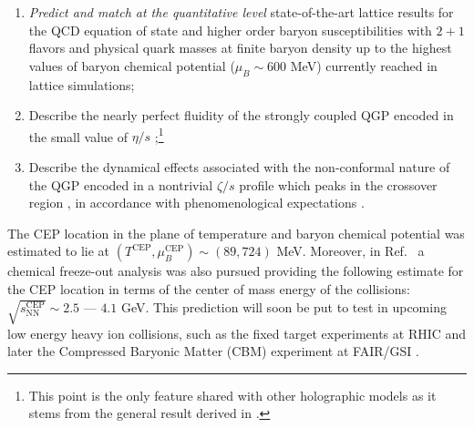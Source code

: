 \documentclass[aps,prd,showkeys,superscriptaddress,singlecolumn,nofootinbib,floatfix]{revtex4-1}
\begin{document}
\begin{enumerate}

\item {\it Predict and match at the quantitative level} state-of-the-art lattice results \cite{Bazavov:2017dus,Bellwied:2015lba} for the QCD equation of state and higher order baryon susceptibilities with $2+1$ flavors and physical quark masses at finite baryon density up to the highest values of baryon chemical potential ($\mu_B \sim 600$ MeV) currently reached in lattice simulations;

\item Describe the nearly perfect fluidity of the strongly coupled QGP encoded in the small value of $\eta/s$ \cite{Ryu:2015vwa,Bernhard:2016tnd};\footnote{This point is the only feature shared with other holographic models as it stems from the general result derived in \cite{Kovtun:2004de}.}

\item Describe the dynamical effects associated with the non-conformal nature of the QGP encoded in a nontrivial $\zeta/s$ profile which peaks in the crossover region \cite{Bernhard:2017vql,Bernhard:2018hnz}, in accordance with phenomenological expectations \cite{Karsch:2007jc,NoronhaHostler:2008ju}.
\end{enumerate}

The CEP location in the plane of temperature and baryon chemical potential was estimated to lie at $(T^{\textrm{CEP}},\mu_B^{\textrm{CEP}})\sim(89,724)$ MeV. Moreover, in Ref.\ \cite{Critelli:2017oub} a chemical freeze-out analysis was also pursued providing the following estimate for the CEP location in terms of the center of mass energy of the collisions: $\sqrt{s_{\textrm{NN}}^{\textrm{CEP}}}\sim 2.5$ --- $4.1$ GeV. This prediction will soon be put to test in upcoming low energy heavy ion collisions, such as the fixed target experiments at RHIC \cite{Meehan:2017cum} and later the 
Compressed Baryonic Matter (CBM) experiment at FAIR/GSI \cite{Ablyazimov:2017guv}.
\end{document}
